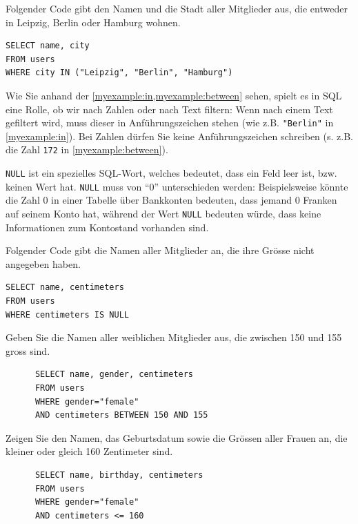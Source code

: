 \begin{myexample}\label{myexample:in}
Folgender Code gibt den Namen und die Stadt aller Mitglieder aus, die entweder in Leipzig, Berlin oder Hamburg wohnen.

\begin{lstlisting}
SELECT name, city
FROM users 
WHERE city IN ("Leipzig", "Berlin", "Hamburg")
\end{lstlisting}
\end{myexample}


\begin{mycaution}
Wie Sie anhand der \cref{myexample:in,myexample:between} sehen, spielt es in SQL eine Rolle, ob  wir nach Zahlen oder nach
  Text filtern: Wenn nach einem Text gefiltert wird, muss dieser in Anführungszeichen stehen (wie z.B.
  \lstinline|"Berlin"| in \cref{myexample:in}). Bei Zahlen dürfen Sie keine Anführungszeichen schreiben (s. z.B. die Zahl
  \lstinline|172| in \cref{myexample:between}).
\end{mycaution}

\lstinline|NULL| ist ein spezielles \gls{SQL}-Wort, welches bedeutet, dass ein Feld leer ist, bzw. keinen
Wert hat. \lstinline|NULL| muss von \enquote{0} unterschieden werden: Beispielsweise könnte die Zahl 0 in einer 
Tabelle über Bankkonten bedeuten, dass jemand 0 Franken auf seinem Konto hat, während der Wert \lstinline|NULL| bedeuten würde, dass keine 
Informationen zum Kontostand vorhanden sind.

\begin{myexample}
  Folgender Code gibt die Namen aller Mitglieder an, die ihre Grösse nicht angegeben haben.
\begin{lstlisting}
SELECT name, centimeters
FROM users 
WHERE centimeters IS NULL
\end{lstlisting}
\end{myexample}


\begin{myexercise}
  Geben Sie die Namen aller weiblichen Mitglieder aus, die zwischen 150 und 155 gross sind.
  \begin{myanswer}
    \begin{lstlisting}
      SELECT name, gender, centimeters
      FROM users
      WHERE gender="female"
      AND centimeters BETWEEN 150 AND 155
    \end{lstlisting}
  \end{myanswer}
\end{myexercise}
\begin{myexercise}
  Zeigen Sie den Namen, das Geburtsdatum sowie die Grössen aller Frauen an, die kleiner oder gleich 160 Zentimeter sind.
  \begin{myanswer}
    \begin{lstlisting}
      SELECT name, birthday, centimeters
      FROM users
      WHERE gender="female"
      AND centimeters <= 160
    \end{lstlisting}
  \end{myanswer}
\end{myexercise}

